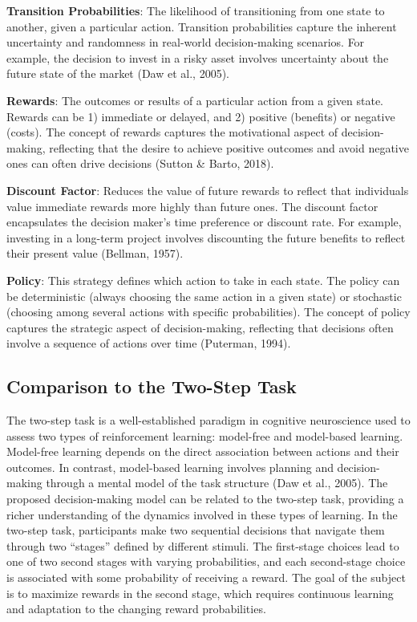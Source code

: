 \documentclass[
]{report}
\begin{document}
\textbf{Transition Probabilities}: The likelihood of transitioning from
one state to another, given a particular action. Transition
probabilities capture the inherent uncertainty and randomness in
real-world decision-making scenarios. For example, the decision to
invest in a risky asset involves uncertainty about the future state of
the market (Daw et al., 2005).

\textbf{Rewards}: The outcomes or results of a particular action from a
given state. Rewards can be 1) immediate or delayed, and 2) positive
(benefits) or negative (costs). The concept of rewards captures the
motivational aspect of decision-making, reflecting that the desire to
achieve positive outcomes and avoid negative ones can often drive
decisions (Sutton \& Barto, 2018).

\textbf{Discount Factor}: Reduces the value of future rewards to reflect
that individuals value immediate rewards more highly than future ones.
The discount factor encapsulates the decision maker's time preference or
discount rate. For example, investing in a long-term project involves
discounting the future benefits to reflect their present value (Bellman,
1957).

\textbf{Policy}: This strategy defines which action to take in each
state. The policy can be deterministic (always choosing the same action
in a given state) or stochastic (choosing among several actions with
specific probabilities). The concept of policy captures the strategic
aspect of decision-making, reflecting that decisions often involve a
sequence of actions over time (Puterman, 1994).

\hypertarget{comparison-to-the-two-step-task}{%
\subsection{Comparison to the Two-Step
Task}\label{comparison-to-the-two-step-task}}

The two-step task is a well-established paradigm in cognitive
neuroscience used to assess two types of reinforcement learning:
model-free and model-based learning. Model-free learning depends on the
direct association between actions and their outcomes. In contrast,
model-based learning involves planning and decision-making through a
mental model of the task structure (Daw et al., 2005). The proposed
decision-making model can be related to the two-step task, providing a
richer understanding of the dynamics involved in these types of
learning. In the two-step task, participants make two sequential
decisions that navigate them through two ``stages'' defined by different
stimuli. The first-stage choices lead to one of two second stages with
varying probabilities, and each second-stage choice is associated with
some probability of receiving a reward. The goal of the subject is to
maximize rewards in the second stage, which requires continuous learning
and adaptation to the changing reward probabilities.
\end{document}
